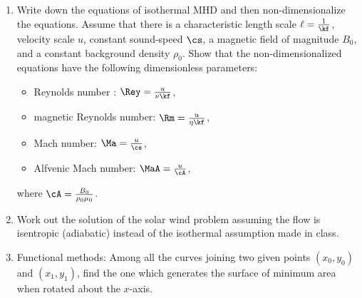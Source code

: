 \documentclass[a4paper,twoside,10pt]{article}
\begin{document}
\begin {enumerate}
\item Write down the equations of isothermal MHD and then
  non-dimensionalize the equations. Assume that there is a
  characteristic length scale $\ell = \frac{1}{\kf}$, velocity scale
  $u$, constant sound-speed $\cs$, a magnetic field of magnitude
  $B_{0}$, and a constant background density $\rho_{0}$. Show that the
  non-dimensionalized equations have the following dimensionless
  parameters:
\begin{itemize}
\item Reynolds number : $\Rey = \frac{u}{\nu\kf}$, 
\item magnetic Reynolds number: $ \Rm = \frac{u}{\eta\kf}$, 
\item Mach number: $\Ma =\frac{u}{\cs}$, 
\item Alfvenic Mach number: $\MaA = \frac{u}{\cA}$,
\end{itemize}
where $\cA = \frac{B_{0}}{\rho_{0}\mu_{0}}$.

\item Work out the solution of the solar wind problem assuming the
  flow is isentropic (adiabatic) instead of the isothermal assumption
  made in class. 
\item Functional methods: Among all the curves joining two given
  points $(x_{0},y_{0})$ and $(x_{1},y_{1})$, find the one which
  generates the surface of minimum area when rotated about the $x$-axis. 
\end{enumerate}
\end{document}
